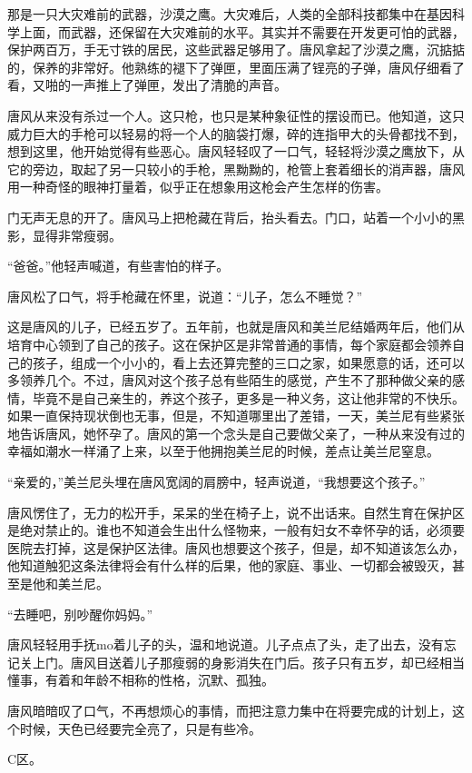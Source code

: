那是一只大灾难前的武器，沙漠之鹰。大灾难后，人类的全部科技都集中在基因科学上面，而武器，还保留在大灾难前的水平。其实并不需要在开发更可怕的武器，保护两百万，手无寸铁的居民，这些武器足够用了。唐风拿起了沙漠之鹰，沉掂掂的，保养的非常好。他熟练的褪下了弹匣，里面压满了锃亮的子弹，唐风仔细看了看，又啪的一声推上了弹匣，发出了清脆的声音。

唐风从来没有杀过一个人。这只枪，也只是某种象征性的摆设而已。他知道，这只威力巨大的手枪可以轻易的将一个人的脑袋打爆，碎的连指甲大的头骨都找不到，想到这里，他开始觉得有些恶心。唐风轻轻叹了一口气，轻轻将沙漠之鹰放下，从它的旁边，取起了另一只较小的手枪，黑黝黝的，枪管上套着细长的消声器，唐风用一种奇怪的眼神打量着，似乎正在想象用这枪会产生怎样的伤害。

门无声无息的开了。唐风马上把枪藏在背后，抬头看去。门口，站着一个小小的黑影，显得非常瘦弱。

“爸爸。”他轻声喊道，有些害怕的样子。

唐风松了口气，将手枪藏在怀里，说道：“儿子，怎么不睡觉？”

这是唐风的儿子，已经五岁了。五年前，也就是唐风和美兰尼结婚两年后，他们从培育中心领到了自己的孩子。这在保护区是非常普通的事情，每个家庭都会领养自己的孩子，组成一个小小的，看上去还算完整的三口之家，如果愿意的话，还可以多领养几个。不过，唐风对这个孩子总有些陌生的感觉，产生不了那种做父亲的感情，毕竟不是自己亲生的，养这个孩子，更多是一种义务，这让他非常的不快乐。如果一直保持现状倒也无事，但是，不知道哪里出了差错，一天，美兰尼有些紧张地告诉唐风，她怀孕了。唐风的第一个念头是自己要做父亲了，一种从来没有过的幸福如潮水一样涌了上来，以至于他拥抱美兰尼的时候，差点让美兰尼窒息。

“亲爱的，”美兰尼头埋在唐风宽阔的肩膀中，轻声说道，“我想要这个孩子。”

唐风愣住了，无力的松开手，呆呆的坐在椅子上，说不出话来。自然生育在保护区是绝对禁止的。谁也不知道会生出什么怪物来，一般有妇女不幸怀孕的话，必须要医院去打掉，这是保护区法律。唐风也想要这个孩子，但是，却不知道该怎么办，他知道触犯这条法律将会有什么样的后果，他的家庭、事业、一切都会被毁灭，甚至是他和美兰尼。

“去睡吧，别吵醒你妈妈。”

唐风轻轻用手抚mo着儿子的头，温和地说道。儿子点点了头，走了出去，没有忘记关上门。唐风目送着儿子那瘦弱的身影消失在门后。孩子只有五岁，却已经相当懂事，有着和年龄不相称的性格，沉默、孤独。

唐风暗暗叹了口气，不再想烦心的事情，而把注意力集中在将要完成的计划上，这个时候，天色已经要完全亮了，只是有些冷。

C区。

